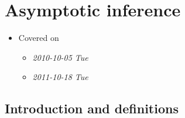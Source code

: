 
\chapter{Asymptotic inference}

\begin{itemize}
\item Covered on
\begin{itemize}
\item \textit{2010-10-05 Tue}
\item \textit{2011-10-18 Tue}
\end{itemize}
\end{itemize}
\section{Introduction and definitions}
\label{sec-1}


